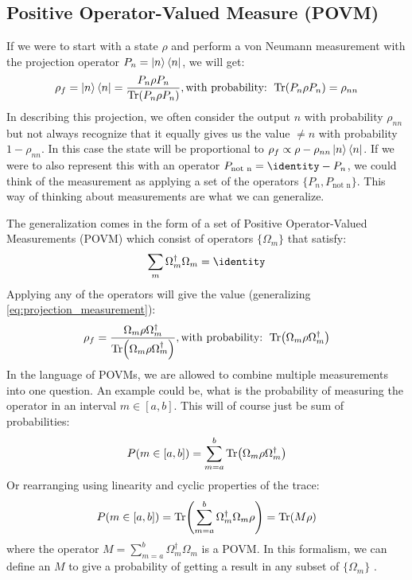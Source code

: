 \subsection{Positive Operator-Valued Measure (POVM)}
If we were to start with a state $\rho$ and perform a von Neumann measurement with the projection operator $P_n = \ket{n}\bra{n}$, we will get:
\begin{equation}\label{eq:projection_measurement}
    \rho_f = \ket{n}\bra{n}= \frac{P_n \rho P_n}{\Tr(P_n \rho P_n)}, \text{with probability: } \Tr(P_n \rho P_n) = \rho_{nn}
\end{equation}
In describing this projection, we often consider the output $n$ with probability $\rho_{nn}$ but not always recognize that it equally gives us the value $\neq n$ with probability $1 - \rho_{nn}$. In this case the state will be proportional to $\rho_f \propto \rho - \rho_{nn}\ket{n}\bra{n}$. If we were to also represent this with an operator $P_{\text{not n}} = \identity - P_n$, we could think of the measurement as applying  a set of the operators $\{P_n, P_{\text{not n}}\}$. This way of thinking about measurements are what we can generalize. 

The generalization comes in the form of a set of Positive Operator-Valued Measurements (POVM) which consist of operators $\{\Omega_m\}$ that satisfy:
\begin{equation}\label{eq:sum_requirement_POVM}
    \sum_m \Omega_m^\dagger \Omega_m = \identity
\end{equation}
Applying any of the operators will give the value (generalizing \ref{eq:projection_measurement}):
\begin{equation}
        \rho_f = \frac{\Omega_m \rho  \Omega_m^\dagger}{\Tr(\Omega_m \rho \Omega_m^\dagger)}, \text{with probability: } \Tr(\Omega_m \rho \Omega_m^\dagger)
\end{equation}
In the language of POVMs, we are allowed to combine multiple measurements into one question. An example could be, what is the probability of measuring the operator in an interval $m\in[a, b]$. This will of course just be sum of probabilities: 
\begin{equation}
    P(m \in [a, b]) = \sum_{m = a}^b \Tr(\Omega_m\rho\Omega_m^\dagger)
\end{equation}
Or rearranging using linearity and cyclic properties of the trace:
\begin{equation}
    P(m \in [a, b]) = \Tr( \sum_{m = a}^b \Omega_m^\dagger \Omega_m\rho) = \Tr(M \rho)
\end{equation}
where the operator $M = \sum_{m = a}^b \Omega_m^\dagger \Omega_m$ is a POVM. In this formalism, we can define an $M$ to give a probability of getting a result in any subset of $\{\Omega_m\}$ \cite{jacobs_straightforward_2006}. 

